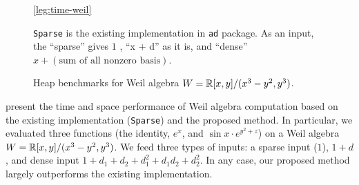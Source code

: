 \documentclass[rims-smooth-paper.tex]{subfiles}
\begin{document}
\begin{figure}[btp]
\begin{center}
  \ref{leg:time-weil}

  \texttt{Sparse} is the existing implementation in \texttt{ad} package.
  As an input, the ``sparse'' gives $1$ , ``x + d'' as it is, and ``dense'' $x + (\text{sum of all nonzero basis})$.
  
  \caption{Heap benchmarks for Weil algebra $W = \mathbb{R}[x,y]/(x^3 - y^2, y^3)$. \label{fig:weil-heap-bench}}
  \end{center}
\end{figure}

 present the time and space performance of Weil algebra computation based on the existing implementation (\texttt{Sparse}) and the proposed method.
In particular, we evaluated three functions (the identity, $e^x$, and $\sin x \cdot e^{y^2 + z}$) on a Weil algebra $W = \mathbb{R}[x,y]/(x^3 - y^2, y^3)$.
We feed three types of inputs: a sparse input ($1$), $1 + d$, and dense input $1 + d_1 + d_2 + d_1^2 + d_1 d_2 + d_2^2$.
In any case, our proposed method largely outperforms the existing implementation.
\end{document}
